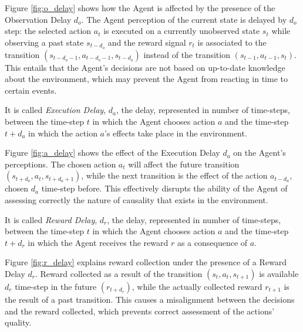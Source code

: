             Figure \ref{fig:o_delay} shows how the Agent is affected by the presence of the Observation Delay $d_o$. The Agent perception of the current state is delayed by $d_o$ step: the selected action $a_t$ is executed on a currently unobserved state $s_{t}$ while observing a past state $s_{t-d_{o}}$ and the reward signal $r_t$ is associated to the transition $(s_{t-d_{o}-1}, a_{t-d_{o}-1}, s_{t-d_{o}})$ instead of the transition $(s_{t-1}, a_{t-1}, s_{t})$. This entails that the Agent's decisions are not based on up-to-date knowledge about the environment, which may prevent the Agent from reacting in time to certain events.
            
            \begin{definition}
                \label{def:execdelay}
                It is called \textit{Execution Delay}, $d_a$, the delay, represented in number of time-steps, between the time-step $t$ in which the Agent chooses action $a$ and the time-step $t+d_a$ in which the action $a$'s effects take place in the environment.
            \end{definition}
            
            Figure \ref{fig:a_delay} shows the effect of the Execution Delay $d_a$ on the Agent's perceptions. The chosen action $a_t$ will affect the future transition $(s_{t+d_{a}}, a_t, s_{t+d_{a}+1})$, while the next transition is the effect of the action $a_{t-d_{a}}$, chosen $d_a$ time-step before. This effectively disrupts the ability of the Agent of assessing correctly the nature of causality that exists in the environment. 
            
            \begin{definition}
                \label{def:rewdelay}
                It is called \textit{Reward Delay}, $d_r$, the delay, represented in number of time-steps, between the time-step $t$ in which the Agent chooses action $a$ and the time-step $t+d_r$ in which the Agent receives the reward $r$ as a consequence of $a$.
            \end{definition}
            
            Figure \ref{fig:r_delay} explains reward collection under the presence of a Reward Delay $d_r$. Reward collected as a result of the transition $(s_t, a_t, s_{t+1})$ is available $d_r$ time-step in the future $(r_{t+d_{r}})$, while the actually collected reward $r_{t+1}$ is the result of a past transition. This causes a misalignment between the decisions and the reward collected, which prevents correct assessment of the actions' quality.
            
